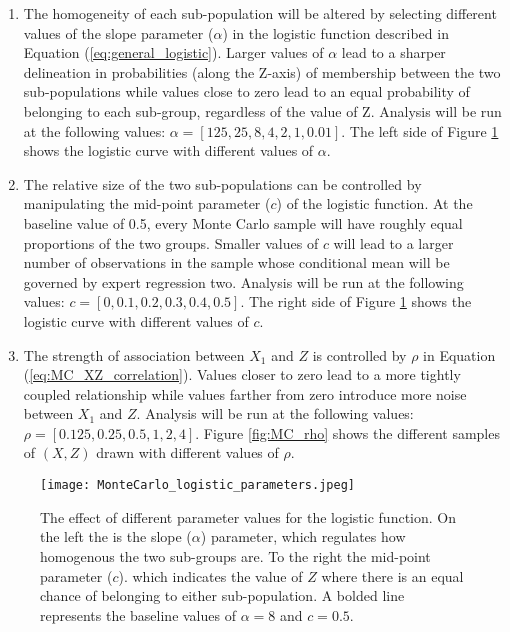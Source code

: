 \documentclass[12pt]{article}
\theoremstyle{definition}
\begin{document}
\begin{enumerate}
    \item The homogeneity of each sub-population will be altered by selecting different values of the slope parameter ($\alpha$) in the logistic function described in Equation (\ref{eq:general_logistic}). Larger values of $\alpha$ lead to a sharper delineation in probabilities (along the Z-axis) of membership between the two sub-populations while values close to zero lead to an equal probability of belonging to each sub-group, regardless of the value of Z. Analysis will be run at the following values: $\alpha = [125, 25, 8, 4, 2, 1, 0.01]$. The left side of Figure \ref{fig:MC_logistic_pars} shows the logistic curve with different values of $\alpha$.
    
    \item The relative size of the two sub-populations can be controlled by manipulating the mid-point parameter ($c$) of the logistic function. At the baseline value of 0.5, every Monte Carlo sample will have roughly equal proportions of the two groups. Smaller values of $c$ will lead to a larger number of observations in the sample whose conditional mean will be governed by expert regression two. Analysis will be run at the following values: $c = [0, 0.1, 0.2, 0.3, 0.4, 0.5]$. The right side of Figure \ref{fig:MC_logistic_pars} shows the logistic curve with different values of $c$.
  
    \item The strength of association between $X_{1}$ and $Z$ is controlled by $\rho$ in Equation (\ref{eq:MC_XZ_correlation}). Values closer to zero lead to a more tightly coupled relationship while values farther from zero introduce more noise between $X_{1}$ and $Z$. Analysis will be run at the following values: $\rho = [0.125, 0.25, 0.5, 1, 2, 4]$. Figure \ref{fig:MC_rho} shows the different samples of $(X, Z)$ drawn with different values of $\rho$.
\end{enumerate}


\begin{figure}[!ht]
  \centering
  \texttt{[image: MonteCarlo\_logistic\_parameters.jpeg]}
  \caption{The effect of different parameter values for the logistic function. On the left the is the slope ($\alpha$) parameter, which regulates how homogenous the two sub-groups are. To the right the mid-point parameter ($c$). which indicates the value of $Z$ where there is an equal chance of belonging to either sub-population. A bolded line represents the baseline values of $\alpha = 8$ and $c = 0.5$.}
  \label{fig:MC_logistic_pars}
\end{figure}
\end{document}

